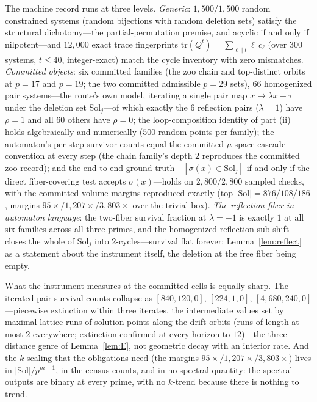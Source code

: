 \documentclass[11pt,a4paper]{article}
\numberwithin{equation}{section}
\theoremstyle{plain}
\theoremstyle{definition}
\theoremstyle{remark}
\begin{document}
The machine record runs at three levels. \emph{Generic}:
$1{,}500/1{,}500$ random constrained systems (random bijections with
random deletion sets) satisfy the structural dichotomy---the
partial-permutation premise, and acyclic if and only if
nilpotent---and $12{,}000$ exact trace fingerprints
$\mathrm{tr}(Q^t)=\sum_{\ell\mid t}\ell\,c_\ell$ (over $300$ systems,
$t\le 40$, integer-exact) match the cycle inventory with zero
mismatches. \emph{Committed objects}: six committed families (the zoo
chain and top-distinct orbits at $p=17$ and $p=19$; the two committed
admissible $p=29$ sets), $66$ homogenized pair systems---the route's
own model, iterating a single pair map $x\mapsto\lambda x+\tau$ under
the deletion set $\mathrm{Sol}_j$---of which exactly the $6$
reflection pairs ($\bar\lambda=1$) have $\rho=1$ and all $60$ others
have $\rho=0$; the loop-composition identity of part (ii) holds
algebraically and numerically ($500$ random points per family); the
automaton's per-step survivor counts equal the committed $\mu$-space
cascade convention at every step (the chain family's depth $2$
reproduces the committed zoo record); and the end-to-end ground
truth---$[\sigma(x)\in\mathrm{Sol}_j]$ if and only if the direct
fiber-covering test accepts $\sigma(x)$---holds on $2{,}800/2{,}800$
sampled checks, with the committed volume margins reproduced exactly
(top $|\mathrm{Sol}|=876/108/186$, margins
$95\times/1{,}207\times/3{,}803\times$ over the trivial box).
\emph{The reflection fiber in automaton language}: the two-fiber
survival fraction at $\lambda=-1$ is exactly $1$ at all six families
across all three primes, and the homogenized reflection sub-shift
closes the whole of $\mathrm{Sol}_j$ into $2$-cycles---survival flat
forever: Lemma~\ref{lem:reflect} as a statement about the instrument
itself, the deletion at the free fiber being empty.

What the instrument measures at the committed cells is equally sharp.
The iterated-pair survival counts collapse as $[840,120,0]$,
$[224,1,0]$, $[4{,}680,240,0]$---piecewise extinction within three
iterates, the intermediate values set by maximal lattice runs of
solution points along the drift orbits (runs of length at most $2$
everywhere; extinction confirmed at every horizon to $12$)---the
three-distance genre of Lemma~\ref{lem:E}, not geometric decay with
an interior rate. And the $k$-scaling that the obligations need (the
margins $95\times/1{,}207\times/3{,}803\times$) lives in
$|\mathrm{Sol}|/p^{m-1}$, in the census counts, and in no spectral
quantity: the spectral outputs are binary at every prime, with no
$k$-trend because there is nothing to trend.
\end{document}
